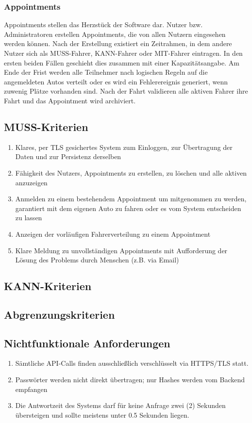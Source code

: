 \documentclass[11pt,a4paper]{article}
\begin{document}
\subsubsection{Appointments}
Appointments stellen das Herzstück der Software dar. Nutzer bzw. Administratoren erstellen Appointments, die von allen Nutzern eingesehen werden können. Nach der Erstellung existiert ein Zeitrahmen, in dem andere Nutzer sich als MUSS-Fahrer, KANN-Fahrer oder MIT-Fahrer eintragen. In den ersten beiden Fällen geschieht dies zusammen mit einer Kapazitätsangabe.
Am Ende der Frist werden alle Teilnehmer nach logischen Regeln auf die angemeldeten Autos verteilt oder es wird ein Fehlerereignis generiert, wenn zuwenig Plätze vorhanden sind.
Nach der Fahrt validieren alle aktiven Fahrer ihre Fahrt und das Appointment wird archiviert.
\subsection{MUSS-Kriterien}
\begin{enumerate}
\item Klares, per TLS gesichertes System zum Einloggen, zur Übertragung der Daten und zur Persistenz derselben
\item Fähigkeit des Nutzers, Appointments zu erstellen, zu löschen und alle aktiven anzuzeigen
\item Anmelden zu einem bestehendem Appointment um mitgenommen zu werden, garantiert mit dem eigenen Auto zu fahren oder es vom System entscheiden zu lassen
\item Anzeigen der vorläufigen Fahrerverteilung zu einem Appointment
\item Klare Meldung zu unvollständigen Appointments mit Aufforderung der Lösung des Problems durch Menschen (z.B. via Email)
\end{enumerate}
\subsection{KANN-Kriterien}
\subsection{Abgrenzungskriterien}
\subsection{Nichtfunktionale Anforderungen}
\begin{enumerate}
\item Sämtliche API-Calls finden ausschließlich verschlüsselt via HTTPS/TLS statt.
\item Passwörter werden nicht direkt übertragen; nur Hashes werden vom Backend empfangen
\item Die Antwortzeit des Systems darf für keine Anfrage zwei (2) Sekunden übersteigen und sollte meistens unter 0.5 Sekunden liegen.
\end{enumerate}
\end{document}
